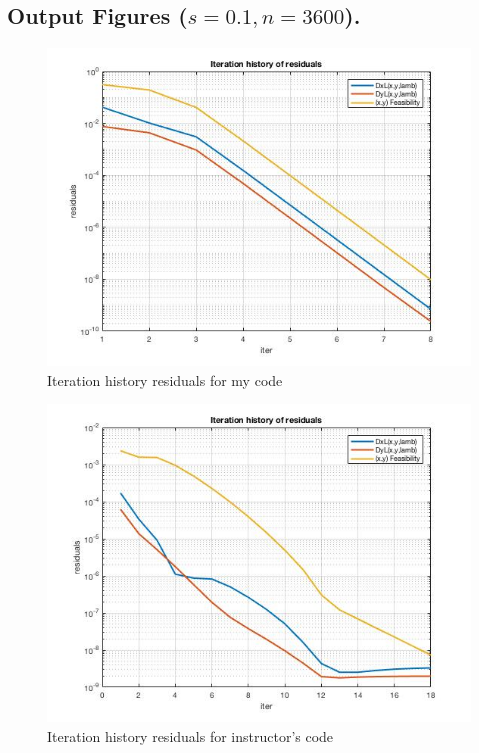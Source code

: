 \subsection{Output Figures ($s=0.1,n=3600$).}
\begin{figure}[H]
\centering
\includegraphics[width=12cm]{F_1/F_1_2.jpg}
\caption{Iteration history residuals for my code}
\end{figure}
\begin{figure}[H]
\centering
\includegraphics[width=12cm]{F_1/F_1_3.jpg}
\caption{Iteration history residuals for instructor's code}
\end{figure}

